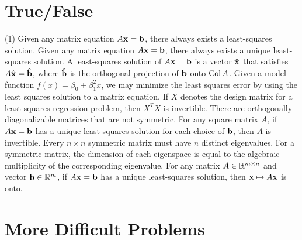 \section{True/False}

\trueFalseHeader

\begin{tasks}[resume, style=enumerate](1)
\task
  Given any matrix equation $A\mathbf x = \mathbf b$, there always exists a
  least-squares solution.
\task
  Given any matrix equation $A\mathbf x = \mathbf b$, there always exists a unique
  least-squares solution.
\task
  A least-squares solution of $A\mathbf x = \mathbf b$ is a vector $\hat{\mathbf x}$
  that satisfies $A\hat{\mathbf x} = \hat{\mathbf b}$, where $\hat{\mathbf b}$ is the
  orthogonal projection of $\mathbf b$ onto $\operatorname{\mathrm{Col}} A$.
\task
  Given a model function $f(x) = \beta_0 + \beta_1^2 x$, we may
  minimize the least squares error by using the least squares solution
  to a matrix equation.
\task
  If $X$ denotes the design matrix for a least squares regression
  problem, then $X^T X$ is invertible.
\task
  There are orthogonally diagonalizable matrices that are not symmetric.
\task
  For any square matrix $A$, if $A \mathbf x = \mathbf b$ has a unique least
  squares solution for each choice of $\mathbf b$, then $A$ is invertible.
\task
  Every $n \times n$ symmetric matrix must have $n$ distinct eigenvalues.
\task
  For a symmetric matrix, the dimension of each eigenspace is equal to
  the algebraic multiplicity of the corresponding eigenvalue.
\task
  For any matrix $A \in \mathbb R^{m \times n}$ and
  vector $\mathbf b \in \mathbb R^m$, if $A\mathbf x = \mathbf b$ has
  a unique least-squares solution, then $\mathbf x \mapsto A\mathbf x$ is onto.
\end{tasks}

\section{More Difficult Problems}

